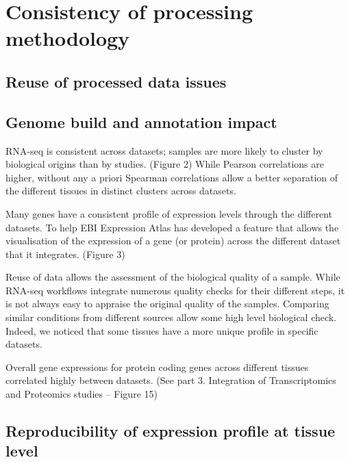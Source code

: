 %



\section{Consistency of processing methodology}\label{sec:Trans_consistentMethodo}

    \subsection{Reuse of processed data issues}\label{subsec:Trans_reuseOfData}

    \subsection{Genome build and annotation impact}\label{subsec:Trans_AnnotImpact}

RNA-seq is consistent across datasets; samples are more likely to cluster by
biological origins than by studies. (Figure 2)
While Pearson correlations are higher, without any a priori Spearman correlations
allow a better separation of the different tissues in distinct clusters across
datasets.

Many genes have a consistent profile of expression levels through the different
datasets.
To help EBI Expression Atlas has developed a feature that allows the visualisation
of the expression of a gene (or protein) across the different dataset that it
integrates. (Figure 3)

Reuse of data allows the assessment of the biological quality of a sample.
While RNA-seq workflows integrate numerous quality checks for their different steps,
it is not always easy to appraise the original quality of the samples. Comparing
similar conditions from different sources allow some high level biological check.
Indeed, we noticed that some tissues have a more unique profile in specific
datasets.

Overall gene expressions for protein coding genes across different tissues
correlated highly between datasets. (See part 3. Integration of Transcriptomics
and Proteomics studies – Figure 15)



    \subsection{Reproducibility of expression profile at tissue level}\label{subsec:Trans_ReproExpresTissue}

